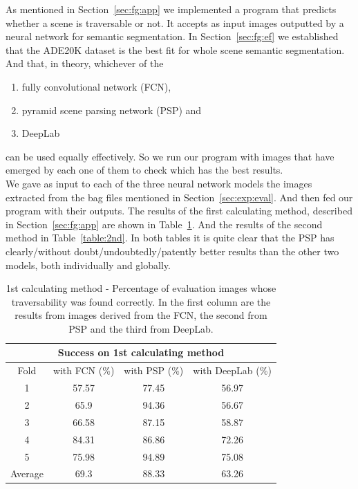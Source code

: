 \documentclass[12pt,a4paper,table,dvipsnames,tikz]{report}
\newcommand{\acronym}{\MakeUppercase}
\newcommand{\bl}[1]{{\hypersetup{linkcolor=blue}#1}}
\begin{document}
	As mentioned in Section~\ref{sec:fg:app} we implemented a program that predicts whether 
	a scene is traversable or not. It accepts as input images outputted by a neural network 
	for semantic segmentation. In Section~\ref{sec:fg:ef} we established that the 
	\acronym{ade20k} dataset is the best fit for whole scene semantic segmentation. And that, 
	in theory, whichever of the
	\begin{enumerate}
		\item fully convolutional network (\acronym{fcn}), 
		\item pyramid scene parsing network (\acronym{psp}) and 
		\item DeepLab 
	\end{enumerate}
	can be used equally effectively. So we run our program with images that have emerged by 
	each one of them to check which has the best results.
	\\
	
	We gave as input to each of the three neural network models the images extracted from the 
	bag files mentioned in Section~\ref{sec:exp:eval}. And then fed our program with their 
	outputs. The results of the first calculating method, described in Section~\ref{sec:fg:app} 
	are shown in Table~\bl{\ref{table:1st}}. And the results of the second method in 
	Table~\bl{\ref{table:2nd}}. In both tables it is quite clear that the PSP has clearly/without doubt/undoubtedly/patently better results than the other two models, both individually and globally.
	\\
	
	\begin{table}[h!]
		\centering
		\begin{tabular}{|c|c|c|c|}
			\hline
			\multicolumn{4}{|c|}{Success on 1st calculating method}\\
			\hline
			Fold & with \acronym{fcn} (\%) & with \acronym{psp} (\%) & with DeepLab (\%)\\ 
			\hline\hline
			1 & 57.57 & 77.45 & 56.97\\
			\hline
			2 & 65.9 & 94.36 & 56.67\\
			\hline
			3 & 66.58 & 87.15 & 58.87\\
			\hline
			4 & 84.31 & 86.86 & 72.26\\
			\hline
			5 & 75.98 & 94.89 & 75.08\\
			\hline\hline
			Average & 69.3 & 88.33 & 63.26\\
			\hline
		\end{tabular}
		\caption{1st calculating method - Percentage of evaluation images whose 
		traversability was found correctly. In the first column are the results from 
		images derived from the \acronym{fcn}, the second from \acronym{psp} and the 
		third from DeepLab.}
		\label{table:1st}
	\end{table}
	
\end{document}
